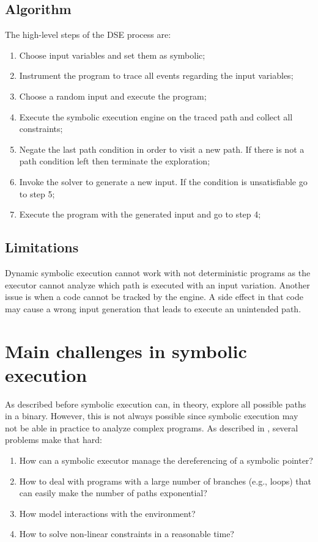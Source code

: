 \subsection{Algorithm}

The high-level steps of the DSE process are:

\begin{enumerate}
\item Choose input variables and set them as symbolic;
\item Instrument the program to trace all events regarding the input variables;
\item Choose a random input and execute the program;
\item Execute the symbolic execution engine on the traced path and collect all constraints;
\item Negate the last path condition in order to visit a new path. If there is not a path condition left then terminate the exploration;
\item Invoke the solver to generate a new input. If the condition is unsatisfiable go to step 5;
\item Execute the program with the generated input and go to step 4;
\end{enumerate}

\subsection{Limitations}
\label{dynamic_limit}

Dynamic symbolic execution cannot work with not deterministic programs as the executor cannot analyze which path is executed with an input variation.
Another issue is when a code cannot be tracked by the engine. A side effect in that code may cause a wrong input generation that leads to execute an unintended path.

\section{Main challenges in symbolic execution}

As described before symbolic execution can, in theory, explore all possible paths in a binary. However, this is not always possible since symbolic execution may not be able in practice to analyze complex programs.
As described in \cite{SurveySymExec-CSUR18}, several problems make that hard:

\begin{enumerate}
\item How can a symbolic executor manage the dereferencing of a symbolic pointer?
\item How to deal with programs with a large number of branches (e.g., loops) that can easily make the number of paths exponential?
\item How model interactions with the environment?
\item How to solve non-linear constraints in a reasonable time?
\end{enumerate}

